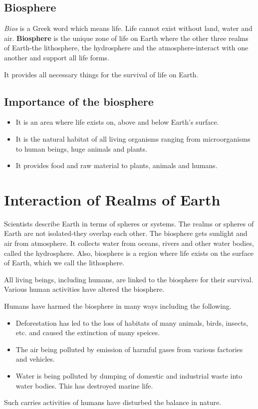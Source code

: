 \subsection{Biosphere}
\textit{Bios} is a Greek word which means life. Life cannot exist without land, water and air. \textbf{Biosphere} is the unique zone of life on Earth where the other three realms of Earth-the lithosphere, the hydrosphere and the atmosphere-interact with one another and support all life forms.
\vspace{0.1in}
\par
It provides all necessary things for the survival of life on Earth.
\subsection{\textbf{Importance of the biosphere}}
\begin{itemize}
    \item It is an area where life exists on, above and below Earth's surface.
    \item It is the natural habitat of all living organisms ranging from microorganisms to human beings, huge animals and plants.
    \item It provides food and raw material to plants, animals and humans.
\end{itemize}
\section{Interaction of Realms of Earth}
Scientists describe Earth in terms of spheres or systems. The realms or spheres of Earth are not isolated-they overlap each other. The biosphere gets sunlight and air from atmosphere. It collects water from oceans, rivers and other water bodies, called the hydrosphere. Also, biosphere is a region where life exists on the surface of Earth, which we call the lithosphere.
\vspace{0.1in}
\par
All living beings, including humans, are linked to the biosphere for their survival. Various human activities have altered the biosphere.
\vspace{0.6in}
\par
Humans have harmed the biosphere in many ways including the following.
\begin{itemize}
    \item Deforestation has led to the loss of habitats of many animals, birds, insects, etc. and caused the extinction of many speices.
    \item The air being polluted by emission of harmful gases from various factories and vehicles.
    \item Water is being polluted by dumping of domestic and industrial waste into water bodies. This has destroyed marine life.
\end{itemize}
\par
Such carries activities of humans have disturbed the balance in nature.
\vspace{1.2in}
